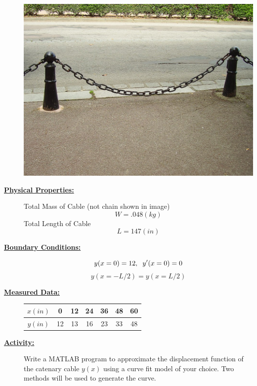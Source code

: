 \documentclass[12pt]{article}
\begin{document}
\begin{description}
\begin{multicols}{2}
	\includegraphics[scale=.2]{hanging_chain.jpg}

	\end{multicols}



  \item[\textbf{\underline{Physical Properties:}}] \hfill \vspace{0mm}
  
  Total Mass of Cable (not chain shown in image)
 	\[W = .048 (kg) \]
 	Total Length of Cable 
 	\[L = 147 (in) \]

  \item[\textbf{\underline{Boundary Conditions:}}] \hfill \vspace{0mm}
  
  \[y(x=0)=12, \hspace{2mm} y'(x=0)=0 \]
  \[y(x=-L/2)=y(x=L/2) \] 


  \item[\textbf{\underline{Measured Data:}}] \hfill \vspace{0mm}
 
   \begin{tabular}{|c|c|c|c|c|c|c|} \hline
   $x(in)$&0&12&24&36&48&60\\ \hline
   $y(in)$&12&13&16&23&33&48\\ \hline 
   \end{tabular}


\newpage
\item[\textbf{\underline{Activity:}}] \hfill \vspace{0mm}

Write a MATLAB program to approximate the displacement function of the catenary cable $y(x)$ using a curve fit model of your choice. Two methods will be used to generate the curve.


\end{description}
\end{document}
